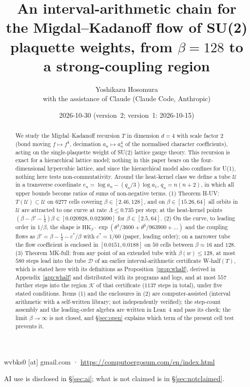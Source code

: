 \documentclass[11pt,a4paper]{article}
\title{An interval-arithmetic chain for the Migdal--Kadanoff flow of SU(2) plaquette weights, from $\beta=128$ to a strong-coupling region}
\author{Yoshikazu Hosomura\\[.3em]\normalsize with the assistance of Claude (Claude Code, Anthropic)}
\date{2026-10-30 (version~2; version~1: 2026-10-15)}
\theoremstyle{definition}
\theoremstyle{remark}
\newcommand{\HK}{\mathrm{HK}}
\newcommand{\cU}{\mathcal{U}}
\newcommand{\cD}{\mathcal{D}}
\newcommand{\cK}{\mathcal{K}}
\newcommand{\IA}{computer-assisted (interval arithmetic with a self-written library; not independently verified)}
\begin{document}
\maketitle
\begin{center}\small wvbks0 [at] gmail.com · \url{https://computoergosum.com/en/index.html}\end{center}
\begin{center}\small AI use is disclosed in \S\ref{sec:ai}; what is not claimed is in \S\ref{sec:notclaimed}.\end{center}

\begin{abstract}
We study the Migdal--Kadanoff recursion $T$ in dimension $d=4$ with scale factor $2$ (bond moving $f\mapsto f^4$, decimation $a_n\mapsto a_n^4$ of the normalised character coefficients), acting on the single-plaquette weight of SU(2) lattice gauge theory.
This recursion is exact for a hierarchical lattice model; nothing in this paper bears on the four-dimensional hypercubic lattice, and since the hierarchical model also confines for U(1), nothing here tests non-commutativity.
Around the heat-kernel class we define a tube $\cU$ in a transverse coordinate $e_n=\log a_n-(q_n/3)\log a_1$, $q_n=n(n+2)$, in which all upper bounds become ratios of sums of non-negative terms.
(1) Theorem H-UV: $T(\cU)\subset\cU$ on $6277$ cells covering $\beta\in[2.46,128]$, and on $\beta\in[15.26,64]$ all orbits in $\cU$ are attracted to one curve at rate $\Lambda\le 0.735$ per step; at the heat-kernel points $(\beta-\beta'-\tfrac14)\beta\in[0.020928,0.023690]$ for $\beta\in[2.5,64]$.
(2) On the curve, to leading order in $1/\beta$, the shape is $\HK_\beta\cdot\exp(\theta^4/3600+\theta^6/963900+\dots)$ and the coupling flows as $\beta'=\beta-\tfrac14-c^*/\beta$ with $c^*=1/60$ (paper, leading order); on a narrower tube the flow coefficient is enclosed in $[0.0151,0.0188]$ on $50$ cells between $\beta\approx16$ and $128$.
(3) Theorem MK-full: from any point of an extended tube with $\beta(w)\le128$, at most $580$ steps lead into the tube $\cD$ of an earlier interval-arithmetic certificate W-half$(T)$, which is stated here with its definitions as Proposition~\ref{prop:whalf}, derived in Appendix~\ref{app:whalf} and distributed with its programs and logs, and at most $557$ further steps into the region $\cK$ of that certificate ($1137$ steps in total), under five stated conditions.
Items (1) and the enclosures in (2) are \IA; the step-count assembly and the leading-order algebra are written in Lean~4 and pass its check; the limit $\beta\to\infty$ is not closed, and \S\ref{sec:open} explains which term of the present cell test prevents it.
\end{abstract}
\end{document}
